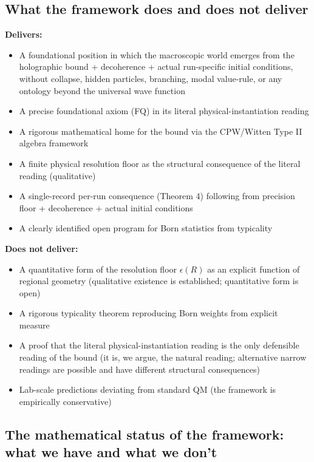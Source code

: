 \documentclass[11pt,a4paper]{article}
\begin{document}
\subsection{What the framework does and does not deliver}

\textbf{Delivers:}
\begin{itemize}
  \item A foundational position in which the macroscopic world emerges from the holographic bound + decoherence + actual run-specific initial conditions, without collapse, hidden particles, branching, modal value-rule, or any ontology beyond the universal wave function
  \item A precise foundational axiom (FQ) in its literal physical-instantiation reading
  \item A rigorous mathematical home for the bound via the CPW/Witten Type II algebra framework
  \item A finite physical resolution floor as the structural consequence of the literal reading (qualitative)
  \item A single-record per-run consequence (Theorem 4) following from precision floor + decoherence + actual initial conditions
  \item A clearly identified open program for Born statistics from typicality
\end{itemize}

\textbf{Does not deliver:}
\begin{itemize}
  \item A quantitative form of the resolution floor $\epsilon(R)$ as an explicit function of regional geometry (qualitative existence is established; quantitative form is open)
  \item A rigorous typicality theorem reproducing Born weights from explicit measure
  \item A proof that the literal physical-instantiation reading is the only defensible reading of the bound (it is, we argue, the natural reading; alternative narrow readings are possible and have different structural consequences)
  \item Lab-scale predictions deviating from standard QM (the framework is empirically conservative)
\end{itemize}

\subsection{The mathematical status of the framework: what we have and what we don't}
\end{document}
